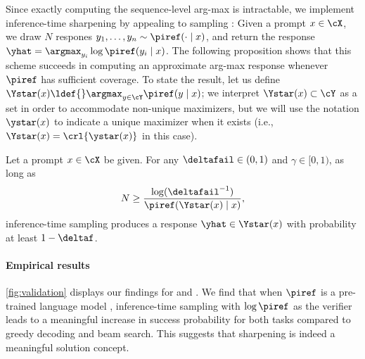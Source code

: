 Since exactly computing the sequence-level arg-max is intractable, we
implement inference-time sharpening by appealing to \BestofN sampling
\citet{stiennon2020learning,touvron2023llama,gao2023scaling,yang2024asymptotics}:
Given a prompt $x\in\cX$, we draw $N$ respones
$y_1,\ldots,y_n\sim\piref(\cdot\mid{}x)$, and return the response
$\yhat=\argmax_{y_i}\log\piref(y_i\mid{}x)$. The following proposition
shows that this scheme succeeds in computing an approximate arg-max
response whenever $\piref$ has sufficient coverage. To state the
result, let us define
$\Ystar(x)\ldef{}\argmax_{y\in\cY}\piref(y\mid{}x)$; we interpret
$\Ystar(x)\subset\cY$ as a set in order to accommodate non-unique
maximizers, but we will use the notation $\ystar(x)$ to indicate a
unique maximizer when it exists (i.e.,
$\Ystar(x)=\crl{\ystar(x)}$ in this case).
  \begin{proposition}
    \label{prop:bestofn_inference}
    Let a prompt $x\in\cX$ be given. For any $\deltafail\in(0,1)$ and $\gamma\in[0,1)$, as long as
    \begin{align}
      N \geq \frac{\log(\deltafail^{-1})}{\piref(\Ystar(x)\mid{}x)},
    \end{align}
    inference-time \BestofN sampling produces a response
    $
    \yhat \in \Ystar(x)$ with probability at least $1-\deltaf$.
  \end{proposition}

\paragraph{Empirical results}
  
  \cref{fig:validation} displays our findings for \gametwentyfour and
  \stargraph. We find that when $\piref$ is a pre-trained language
  model , inference-time \bestofn sampling with
  $\log\piref$ as the verifier leads to a
  meaningful increase in success probability for both tasks compared
  to greedy decoding and beam search. This suggests that sharpening is
  indeed a meaningful solution concept.







    
    

    





